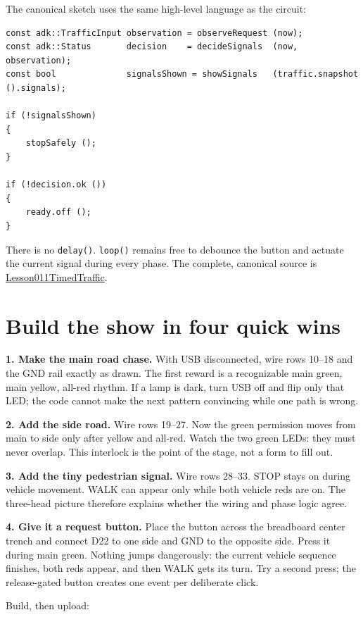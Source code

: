 \documentclass[11pt]{article}
\begin{document}
The canonical sketch uses the same high-level language as the circuit:

\begin{lstlisting}[style=adkcpp]
const adk::TrafficInput observation = observeRequest (now);
const adk::Status       decision    = decideSignals  (now, observation);
const bool              signalsShown = showSignals   (traffic.snapshot ().signals);

if (!signalsShown)
{
    stopSafely ();
}

if (!decision.ok ())
{
    ready.off ();
}
\end{lstlisting}

There is no \texttt{delay()}. \texttt{loop()} remains free to debounce the
button and actuate the current signal during every phase. The complete,
canonical source is
\href{https://github.com/spincyc/adk/tree/main/examples/Lesson011TimedTraffic}
{Lesson011TimedTraffic}.

\section{Build the show in four quick wins}

\textbf{1. Make the main road chase.} With USB disconnected, wire rows
10--18 and the GND rail exactly as drawn. The first
reward is a recognizable main green, main yellow, all-red rhythm. If a lamp is
dark, turn USB off and flip only that LED; the code cannot make the next
pattern convincing while one path is wrong.

\textbf{2. Add the side road.} Wire rows 19--27. Now the green permission moves
from main to side only after yellow and all-red. Watch the two green LEDs:
they must never overlap. This interlock is the point of the stage, not a form
to fill out.

\textbf{3. Add the tiny pedestrian signal.} Wire rows 28--33. STOP stays on
during vehicle movement. WALK can appear only while both vehicle reds are on.
The three-head picture therefore explains whether the wiring and phase logic
agree.

\textbf{4. Give it a request button.} Place the button across the breadboard
center trench and connect D22 to one side and GND to the opposite side. Press
it during main green. Nothing jumps dangerously: the current vehicle sequence
finishes, both reds appear, and then WALK gets its turn. Try a second press;
the release-gated button creates one event per deliberate click.

Build, then upload:
\end{document}
